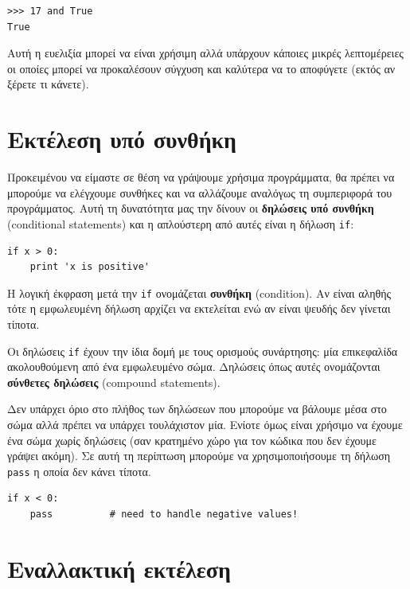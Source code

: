 \documentclass[10pt]{book}
\begin{document}
\begin{verbatim}
>>> 17 and True
True
\end{verbatim}
%

Αυτή η ευελιξία μπορεί να είναι χρήσιμη αλλά υπάρχουν κάποιες μικρές λεπτομέρειες οι οποίες  μπορεί να προκαλέσουν σύγχυση και καλύτερα να το αποφύγετε (εκτός αν ξέρετε τι κάνετε).


\section{Εκτέλεση υπό συνθήκη}
\label{conditional.execution}


Προκειμένου να είμαστε σε θέση να γράψουμε χρήσιμα προγράμματα, θα πρέπει να μπορούμε να ελέγχουμε συνθήκες και να αλλάζουμε αναλόγως τη συμπεριφορά του προγράμματος. Αυτή τη δυνατότητα μας την δίνουν οι {\bf δηλώσεις υπό συνθήκη} (conditional statements) και η  απλούστερη από αυτές είναι η δήλωση {\tt if}:

\begin{verbatim}
if x > 0:
    print 'x is positive'
\end{verbatim}
%

Η λογική έκφραση μετά την {\tt if} ονομάζεται {\bf συνθήκη} (condition). Αν είναι αληθής τότε η εμφωλευμένη δήλωση αρχίζει να εκτελείται ενώ αν είναι ψευδής δεν γίνεται τίποτα.

Οι δηλώσεις  {\tt if}  έχουν την ίδια δομή με τους ορισμούς συνάρτησης:
μία επικεφαλίδα ακολουθούμενη από ένα εμφωλευμένο σώμα. Δηλώσεις όπως αυτές
ονομάζονται {\bf σύνθετες δηλώσεις} (compound statements).

Δεν υπάρχει όριο στο πλήθος των δηλώσεων που μπορούμε να βάλουμε μέσα στο σώμα
αλλά πρέπει να υπάρχει τουλάχιστον μία. Ενίοτε όμως είναι χρήσιμο να έχουμε ένα σώμα χωρίς δηλώσεις (σαν κρατημένο χώρο για τον κώδικα που δεν έχουμε γράψει ακόμη). Σε αυτή τη περίπτωση μπορούμε να χρησιμοποιήσουμε τη δήλωση {\tt pass} η οποία δεν κάνει τίποτα.

\begin{verbatim}
if x < 0:
    pass          # need to handle negative values!
\end{verbatim}
%

\section{Εναλλακτική εκτέλεση}
\label{alternative.execution}
\end{document}
